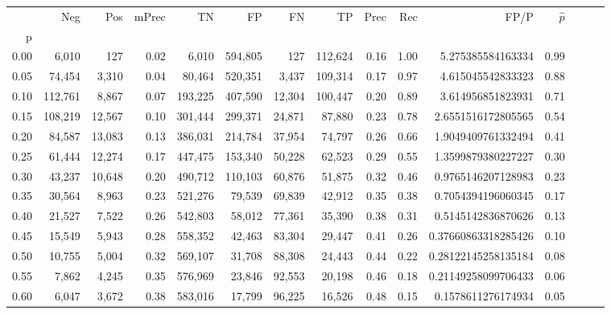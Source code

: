 \begin{tabular}{rrrrrrrrrrrrrrr}
\toprule
{} &      Neg &     Pos & mPrec &       TN &       FP &       FN &       TP &  Prec &   Rec &                  FP/P & $\hat{p}$ \\
p    &          &         &       &          &          &          &          &       &       &                       &           \\
\midrule
0.00 &    6,010 &     127 &  0.02 &    6,010 &  594,805 &      127 &  112,624 &  0.16 &  1.00 &     5.275385584163334 &      0.99 \\
0.05 &   74,454 &   3,310 &  0.04 &   80,464 &  520,351 &    3,437 &  109,314 &  0.17 &  0.97 &     4.615045542833323 &      0.88 \\
0.10 &  112,761 &   8,867 &  0.07 &  193,225 &  407,590 &   12,304 &  100,447 &  0.20 &  0.89 &     3.614956851823931 &      0.71 \\
0.15 &  108,219 &  12,567 &  0.10 &  301,444 &  299,371 &   24,871 &   87,880 &  0.23 &  0.78 &    2.6551516172805565 &      0.54 \\
0.20 &   84,587 &  13,083 &  0.13 &  386,031 &  214,784 &   37,954 &   74,797 &  0.26 &  0.66 &    1.9049409761332494 &      0.41 \\
0.25 &   61,444 &  12,274 &  0.17 &  447,475 &  153,340 &   50,228 &   62,523 &  0.29 &  0.55 &    1.3599879380227227 &      0.30 \\
0.30 &   43,237 &  10,648 &  0.20 &  490,712 &  110,103 &   60,876 &   51,875 &  0.32 &  0.46 &    0.9765146207128983 &      0.23 \\
0.35 &   30,564 &   8,963 &  0.23 &  521,276 &   79,539 &   69,839 &   42,912 &  0.35 &  0.38 &    0.7054394196060345 &      0.17 \\
0.40 &   21,527 &   7,522 &  0.26 &  542,803 &   58,012 &   77,361 &   35,390 &  0.38 &  0.31 &    0.5145142836870626 &      0.13 \\
0.45 &   15,549 &   5,943 &  0.28 &  558,352 &   42,463 &   83,304 &   29,447 &  0.41 &  0.26 &   0.37660863318285426 &      0.10 \\
0.50 &   10,755 &   5,004 &  0.32 &  569,107 &   31,708 &   88,308 &   24,443 &  0.44 &  0.22 &   0.28122145258135184 &      0.08 \\
0.55 &    7,862 &   4,245 &  0.35 &  576,969 &   23,846 &   92,553 &   20,198 &  0.46 &  0.18 &   0.21149258099706433 &      0.06 \\
0.60 &    6,047 &   3,672 &  0.38 &  583,016 &   17,799 &   96,225 &   16,526 &  0.48 &  0.15 &    0.1578611276174934 &      0.05 \\

\end{tabular}
